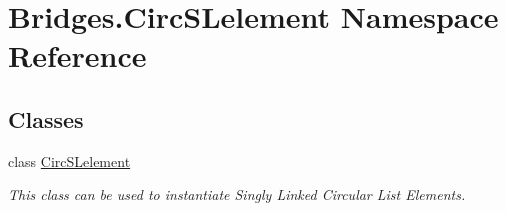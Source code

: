 \hypertarget{namespace_bridges_1_1_circ_s_lelement}{}\section{Bridges.\+Circ\+S\+Lelement Namespace Reference}
\label{namespace_bridges_1_1_circ_s_lelement}
\subsection*{Classes}
\begin{DoxyCompactItemize}
\item 
class \hyperlink{class_bridges_1_1_circ_s_lelement_1_1_circ_s_lelement}{Circ\+S\+Lelement}
\begin{DoxyCompactList}\small\item\em This class can be used to instantiate Singly Linked Circular List Elements. \end{DoxyCompactList}\end{DoxyCompactItemize}
